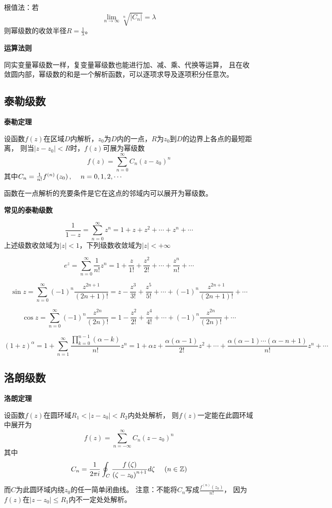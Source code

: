 \documentclass[a4paper,12pt]{article}
\begin{document}
根值法：若
$$
\lim_{n\to\infty}\sqrt[n]{\left|C_n\right|}=\lambda
$$
则幂级数的收敛半径$R=\frac1\lambda$。

\noindent
\textbf{运算法则}

同实变量幂级数一样，复变量幂级数也能进行加、减、乘、代换等运算，
且在收敛圆内部，幂级数的和是一个解析函数，可以逐项求导及逐项积分任意次。

\subsection{泰勒级数}

\noindent
\textbf{泰勒定理}

设函数$f\left(z\right)$在区域$D$内解析，$z_0$为$D$内的一点，$R$为$z_0$到$D$的边界上各点的最短距离，
则当$\left|z-z_0\right|<R$时，$f\left(z\right)$可展为幂级数
$$
f\left(z\right)=\sum_{n=0}^\infty C_n\left(z-z_0\right)^n
$$
其中$C_n=\frac1{n!}f^{(n)}\left(z_0\right),\kern 12pt n=0,1,2,\cdots$

函数在一点解析的充要条件是它在这点的邻域内可以展开为幂级数。

\noindent
\textbf{常见的泰勒级数}

$$
\frac1{1-z}=\sum_{n=0}^\infty z^n
=1+z+z^2+\cdots+z^n+\cdots
$$
上述级数收敛域为$\left|z\right|<1$，下列级数收敛域为$\left|z\right|<+\infty$

$$
e^z=\sum_{n=0}^\infty \frac1{n!}z^n
=1+\frac{z}{1!}+\frac{z^2}{2!}+\cdots+\frac{z^n}{n!}+\cdots
$$

$$
\sin z=\sum_{n=0}^\infty \left(-1\right)^n\frac{z^{2n+1}}{\left(2n+1\right)!}
=z-\frac{z^3}{3!}+\frac{z^5}{5!}+\cdots+
\left(-1\right)^n\frac{z^{2n+1}}{\left(2n+1\right)!}+\cdots
$$

$$
\cos z=\sum_{n=0}^\infty \left(-1\right)^n\frac{z^{2n}}{\left(2n\right)!}
=1-\frac{z^2}{2!}+\frac{z^4}{4!}+\cdots+
\left(-1\right)^n\frac{z^{2n}}{\left(2n\right)!}+\cdots
$$

$$
\left(1+z\right)^\alpha=1+\sum_{n=1}^\infty\frac{\prod_{k=0}^{n-1}\left(\alpha-k\right)}{n!}z^n
=1+\alpha z+\frac{\alpha\left(\alpha-1\right)}{2!}z^2+\cdots+
\frac{\alpha\left(\alpha-1\right)\cdots\left(\alpha-n+1\right)}{n!}z^n+\cdots
$$

\subsection{洛朗级数}

\noindent
\textbf{洛朗定理}

设函数$f\left(z\right)$在圆环域$R_1<\left|z-z_0\right|<R_2$内处处解析，
则$f\left(z\right)$一定能在此圆环域中展开为
$$
f\left(z\right)=\sum_{n=-\infty}^\infty C_n\left(z-z_0\right)^n
$$
其中
$$
C_n=\frac1{2\pi i}\oint_C\frac{f\left(\zeta\right)}{\left(\zeta-z_0\right)^{n+1}}d\zeta
\kern 12pt\left(n\in\mathbb{Z}\right)
$$
而$C$为此圆环域内绕$z_0$的任一简单闭曲线。
注意：不能将$C_n$写成$\frac{f^{\left(n\right)}\left(z_0\right)}{n!}$，
因为$f\left(z\right)$在$\left|z-z_0\right|\le R_1$内不一定处处解析。
\end{document}
